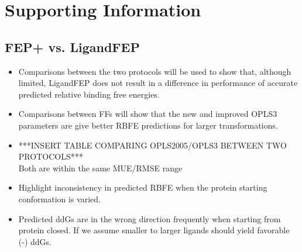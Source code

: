 \documentclass{article}
\begin{document}
\section{Supporting Information}   
\subsection{FEP+ vs. LigandFEP}
   \begin{itemize}
   \item Comparisons between the two protocols will be used to show that, although limited, LigandFEP does not result in a difference in performance of accurate predicted relative binding free energies.
   \item Comparisons between FFs will show that the new and improved OPLS3 parameters are give better RBFE predictions for larger transformations.
   \item ***INSERT TABLE COMPARING OPLS2005/OPLS3 BETWEEN TWO PROTOCOLS***
      \\ Both are within the same MUE/RMSE range
   \item Highlight inconsistency in predicted RBFE when the protein starting conformation is varied.
   \item Predicted ddGs are in the wrong direction frequently when starting from protein closed. 
      If we assume smaller to larger ligands should yield favorable (-) ddGs.
   \end{itemize}
\end{document}
